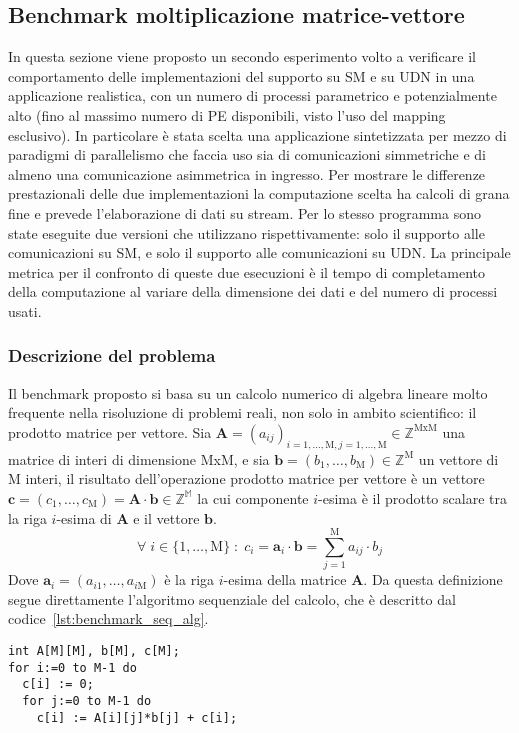 \subsection{Benchmark moltiplicazione matrice-vettore}
In questa sezione viene proposto un secondo esperimento volto a verificare il comportamento delle implementazioni del supporto su SM e su UDN in una applicazione realistica, con un numero di processi parametrico e potenzialmente alto (fino al massimo numero di PE disponibili, visto l'uso del mapping esclusivo). In particolare \`e stata scelta una applicazione sintetizzata per mezzo di paradigmi di parallelismo che faccia uso sia di comunicazioni simmetriche e di almeno una comunicazione asimmetrica in ingresso. Per mostrare le differenze prestazionali delle due implementazioni la computazione scelta ha calcoli di grana fine e prevede l'elaborazione di dati su stream. Per lo stesso programma sono state eseguite due versioni che utilizzano rispettivamente: solo il supporto alle comunicazioni su SM, e solo il supporto alle comunicazioni su UDN. La principale metrica per il confronto di queste due esecuzioni \`e il tempo di completamento della computazione al variare della dimensione dei dati e del numero di processi usati.

\subsubsection{Descrizione del problema}
Il benchmark proposto si basa su un calcolo numerico di algebra lineare molto frequente nella risoluzione di problemi reali, non solo in ambito scientifico: il prodotto matrice per vettore. Sia $\mathbf{A} = (a_{ij})_{i=1,\ldots,\mathrm{M}, j=1,\ldots,\mathrm{M}} \in \mathbb{Z}^{\mathrm{MxM}}$ una matrice di interi di dimensione MxM, e sia $\mathbf{b} = (b_1,\ldots,b_\mathrm{M}) \in \mathbb{Z}^{\mathrm{M}}$ un vettore di M interi, il risultato dell'operazione prodotto matrice per vettore \`e un vettore $\mathbf{c} = (c_1,\ldots,c_\mathrm{M}) = \mathbf{A} \cdot \mathbf{b} \in \mathbb{Z^{M}}$ la cui componente $i$-esima \`e il prodotto scalare tra la riga $i$-esima di $\mathbf{A}$ e il vettore $\mathbf{b}$.
\[ \forall \; i \in \{1,\ldots,\mathrm{M}\} \; : \; c_i = \mathbf{a}_i \cdot \mathbf{b} = \sum_{j=1}^{\mathrm{M}} a_{ij} \cdot b_j  \]
Dove $\mathbf{a}_i = (a_{i1},\ldots,a_{i\mathrm{M}})$ \`e la riga $i$-esima della matrice $\mathbf{A}$. Da questa definizione segue direttamente l'algoritmo sequenziale del calcolo, che \`e descritto dal codice~\ref{lst:benchmark_seq_alg}.\\
\begin{lstlisting}[float = b, morekeywords = {to}, caption = {Algoritmo sequenziale del calcolo matrice per vettore}, label={lst:benchmark_seq_alg}]
int A[M][M], b[M], c[M];
for i:=0 to M-1 do 
  c[i] := 0;
  for j:=0 to M-1 do
    c[i] := A[i][j]*b[j] + c[i];
\end{lstlisting}

